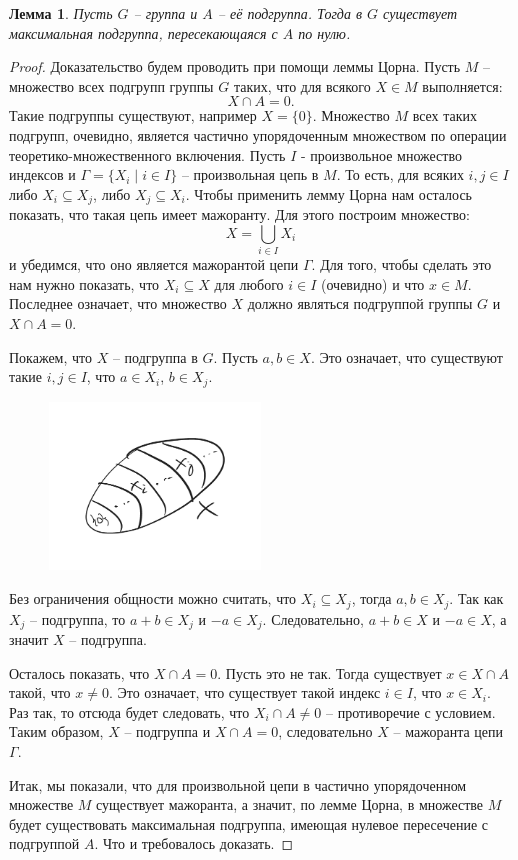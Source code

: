 \documentclass{article}
\newtheorem{lemma}{Лемма}[section]
\begin{document}
\newpage
\begin{lemma}
    Пусть $G$ -- группа и $A$ -- её подгруппа. Тогда в $G$ существует максимальная подгруппа, пересекающаяся с $A$ по нулю.  
\end{lemma}
\begin{proof}
    Доказательство будем проводить при помощи леммы Цорна. Пусть $M$ -- множество всех подгрупп группы $G$ таких, что для всякого $X \in M$ выполняется: $$X \cap A = 0.$$ Такие подгруппы существуют, например $X = \{ 0 \}$. Множество $M$ всех таких подгрупп, очевидно, является частично упорядоченным множеством по операции теоретико-множественного включения.
    Пусть $I$ - произвольное множество индексов и $\Gamma = \{ X_i \mid i \in I \}$ -- произвольная цепь в $M$. То есть, для всяких $i, j \in I$ либо $X_i \subseteq X_j$, либо $X_j \subseteq X_i$. Чтобы применить лемму Цорна нам осталось показать, что такая цепь имеет мажоранту. Для этого построим множество: $$ X = \bigcup_{i \in I} X_i $$ и убедимся, что оно является мажорантой цепи $\Gamma$. Для того, чтобы сделать это нам нужно показать, что $X_i \subseteq X$ для любого $i \in I$ (очевидно) и что $x \in M$. Последнее означает, что множество $X$ должно являться подгруппой группы $G$ и $X \cap A = 0$.
    
    Покажем, что $X$ -- подгруппа в $G$. Пусть $a,b \in X$. Это означает, что существуют такие $i, j \in I$, что $a \in X_i$, $b \in X_j$.
    \begin{figure}[h]
        \includegraphics[width=0.5\textwidth]{set_x}
        \centering
    \end{figure}
    Без ограничения общности можно считать, что $X_i \subseteq X_j$, тогда $a, b \in X_j$. Так как $X_j$ -- подгруппа, то $a + b \in X_j$ и $-a \in X_j$. Следовательно, $a + b \in X$ и $-a \in X$, а значит $X$ -- подгруппа.
    
    Осталось показать, что $X \cap A = 0$. Пусть это не так. Тогда существует $x \in X \cap A$ такой, что $x \neq 0$. Это означает, что существует такой индекс $i \in I$, что $x \in X_i$. Раз так, то отсюда будет следовать, что $X_i \cap A \neq 0$ -- противоречие с условием. Таким образом, $X$ -- подгруппа и $X \cap A = 0$, следовательно $X$ -- мажоранта цепи $\Gamma$.

    Итак, мы показали, что для произвольной цепи в частично упорядоченном множестве $M$ существует мажоранта, а значит, по лемме Цорна, в множестве $M$ будет существовать максимальная подгруппа, имеющая нулевое пересечение с подгруппой $A$. Что и требовалось доказать.
\end{proof}
\end{document}
